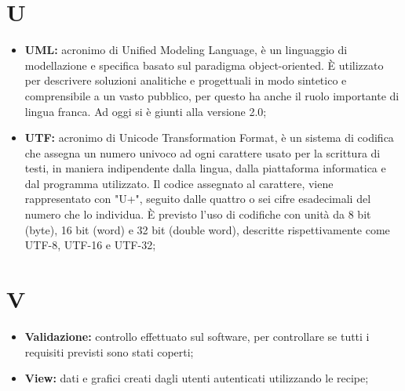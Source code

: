 %



\section*{\Huge U} %
\label{sec:u}
	\begin{itemize}
		\item \textbf{UML:} acronimo di Unified Modeling Language, è un linguaggio di modellazione e specifica basato sul paradigma object-oriented. È utilizzato per descrivere soluzioni analitiche e progettuali in modo sintetico e comprensibile a un vasto pubblico, per questo ha anche il ruolo importante di lingua franca. Ad oggi si è giunti alla versione 2.0;
		\item \textbf{UTF:} acronimo di Unicode Transformation Format, è un sistema di codifica che assegna un numero univoco ad ogni carattere usato per la scrittura di testi, in maniera indipendente dalla lingua, dalla piattaforma informatica e dal programma utilizzato. Il codice assegnato al carattere, viene rappresentato con "U+", seguito dalle quattro o sei cifre esadecimali del numero che lo individua. È previsto l'uso di codifiche con unità da 8 bit (byte), 16 bit (word) e 32 bit (double word), descritte rispettivamente come UTF-8, UTF-16 e UTF-32;
	\end{itemize}
\pagebreak

\section*{\Huge V} %
\label{sec:v}
	\begin{itemize}
		\item \textbf{Validazione:} controllo effettuato sul software, per controllare se tutti i requisiti previsti sono stati coperti;
		\item \textbf{View:} dati e grafici creati dagli utenti autenticati utilizzando le recipe;
	\end{itemize}
\pagebreak

